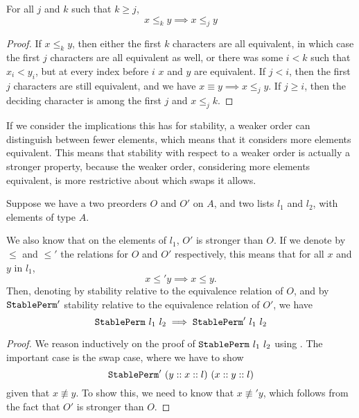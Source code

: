 \documentclass[sigplan,10pt,anonymous,review]{thesis}
\begin{document}
\begin{theorem}
  For all $j$ and $k$ such that $k \ge j$,
  \begin{equation*}
    x \le_k y \implies x \le_j y
  \end{equation*}
\end{theorem}
\begin{proof}
  If $x \le_k y$, then either the first $k$ characters are all
  equivalent, in which case the first $j$ characters are all
  equivalent as well, or there was some $i < k$ such that $x_i < y_i$,
  but at every index before $i$ $x$ and $y$ are equivalent. If $j <
  i$, then the first $j$ characters are still equivalent, and we have
  $x \equiv y \implies x \le_j y$. If $j \ge i$, then the deciding character is
  among the first $j$ and $x \le_j k$.
\end{proof}

If we consider the implications this has for stability, a weaker order
can distinguish between fewer elements, which means that it considers
more elements equivalent. This means that stability with respect to a
weaker order is actually a stronger property, because the weaker
order, considering more elements equivalent, is more restrictive about
which swaps it allows.

\begin{theorem}
  Suppose we have a two preorders $O$ and $O'$ on $A$, and two lists
  $l_1$ and $l_2$, with elements of type $A$.

  We also know that on the elements of $l_1$, $O'$ is stronger than
  $O$. If we denote by $\le$ and $\le'$ the relations for $O$ and $O'$
  respectively, this means that for all $x$ and $y$ in $l_1$,
  \begin{equation*}
    x \le' y \implies x \le y.
  \end{equation*}
  Then, denoting by  stability relative to the
  equivalence relation of $O$, and by $\texttt{\textup{StablePerm}}'$ stability
  relative to the equivalence relation of $O'$, we have
  \begin{equation*}
    \texttt{\textup{StablePerm}}~l_1~l_2 \implies \texttt{\textup{StablePerm}}'~l_1~l_2
  \end{equation*}
\end{theorem}
\begin{proof}
  We reason inductively on the proof of $\texttt{\textup{StablePerm}}~l_1~l_2$
  using . The important case is the swap case,
  where we have to show
  \begin{equation*}
    \texttt{\textup{StablePerm}}'~(y :: x :: l)~(x :: y :: l)
  \end{equation*}
  given that $x \not\equiv y$. To show this, we need to know that $x \not\equiv'
  y$, which follows from the fact that $O'$ is stronger than $O$.
\end{proof}
\end{document}
